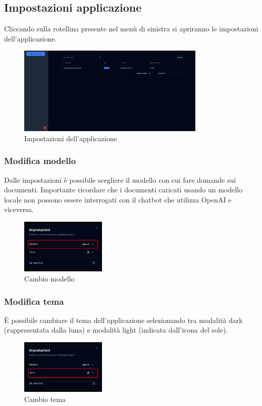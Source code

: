 \subsection{Impostazioni applicazione}
Cliccando sulla rotellina presente nel menù di sinistra si apriranno le impostazioni dell'applicazione.
\begin{figure}[h!]
    \centering
    \includegraphics[width=0.8\textwidth]{schermatadocsetting.png}
    \caption{Impostazioni dell'applicazione}\label{fig:settingdoc}
\end{figure}
\subsubsection{Modifica modello}
Dalle impostazioni è possibile scegliere il modello con cui fare domande sui documenti. Importante ricordare che i documenti caricati usando un modello locale non possono
essere interrogati con il chatbot che utilizza OpenAI e viceversa.
\begin{figure}[h!]
    \centering
    \includegraphics[width=0.364\textwidth]{settingdocmodel.png}
    \caption{Cambio modello}\label{fig:settingdocmodel}
\end{figure}
\subsubsection{Modifica tema}
È possibile cambiare il tema dell'applicazione selezionando tra modalità dark (rappresentata dalla luna) e modalità light (indicata dall'icona del sole).
\begin{figure}[h!]
    \centering
    \includegraphics[width=0.364\textwidth]{settingdoctheme.png}
    \caption{Cambio tema}\label{fig:settingdoctheme}
\end{figure}

